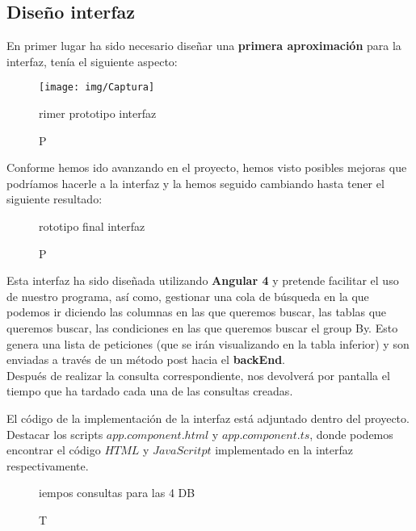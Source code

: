 \documentclass[12pt,a4paper]{article}
\begin{document}

\newpage


\subsection{Diseño interfaz} \label{pto72}


En primer lugar ha sido necesario diseñar una \textbf{primera aproximación} para la interfaz, tenía el siguiente aspecto:

\begin{figure}[!h]
\centering
\texttt{[image: img/Captura]}
\label{int1}
\caption Primer prototipo interfaz
\end{figure}


Conforme hemos ido avanzando en el proyecto, hemos visto posibles mejoras que podríamos hacerle a la interfaz y la hemos seguido cambiando hasta tener el siguiente resultado:

\begin{figure}[!h]
\centering
{}
\caption Prototipo final interfaz
\label{int2}
\end{figure}

Esta interfaz ha sido diseñada utilizando \textbf{Angular 4} y pretende facilitar el uso de nuestro programa, así como, gestionar una cola de búsqueda en la que podemos ir diciendo las columnas en las que queremos buscar, las tablas que queremos buscar, las condiciones en las que queremos buscar el group By. Esto genera una lista de peticiones (que se irán visualizando en la tabla inferior) y son enviadas a través de un método post hacia el \textbf{backEnd}. \\

Después de realizar la consulta correspondiente, nos devolverá por pantalla el tiempo que ha tardado cada una de las consultas creadas.

El código de la implementación de la interfaz está adjuntado dentro del proyecto. Destacar los scripts $app.component.html$ y $app.component.ts$, donde podemos encontrar el código $HTML$ y $JavaScritpt$ implementado en la interfaz respectivamente.\\

\begin{figure}[!h]
\centering
{}
\caption Tiempos consultas para las 4 DB
\label{int3}
\end{figure}
\end{document}
